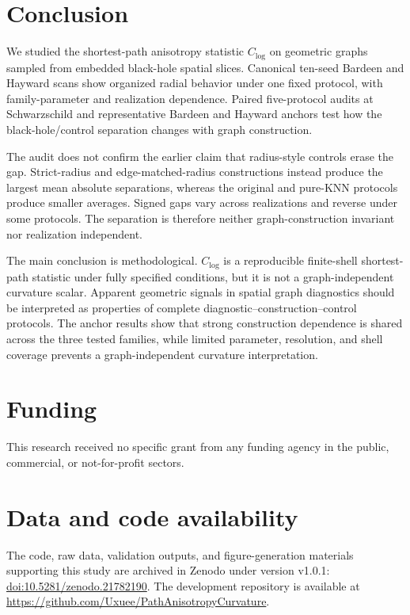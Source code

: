 \documentclass[11pt]{article}
\newcommand{\clog}{C_{\log}}
\begin{document}
\section{Conclusion}

We studied the shortest-path anisotropy statistic $\clog$ on geometric graphs
sampled from embedded black-hole spatial slices. Canonical ten-seed Bardeen and
Hayward scans show organized radial behavior under one fixed protocol, with
family-parameter and realization dependence. Paired five-protocol audits at
Schwarzschild and representative Bardeen and Hayward anchors test how the
black-hole/control separation changes with graph construction.

The audit does not confirm the earlier claim that radius-style controls erase
the gap. Strict-radius and edge-matched-radius constructions instead produce the
largest mean absolute separations, whereas the original and pure-KNN protocols
produce smaller averages. Signed gaps vary across realizations and reverse under
some protocols. The separation is therefore neither graph-construction
invariant nor realization independent.

The main conclusion is methodological. $\clog$ is a reproducible finite-shell
shortest-path statistic under fully specified conditions, but it is not a
graph-independent curvature scalar. Apparent geometric signals in spatial graph
diagnostics should be interpreted as properties of complete
 diagnostic--construction--control protocols. The anchor results show that
strong construction dependence is shared across the three tested families,
while limited parameter, resolution, and shell coverage prevents a
graph-independent curvature interpretation.

\section*{Funding}

This research received no specific grant from any funding agency in the
public, commercial, or not-for-profit sectors.

\section*{Data and code availability}

The code, raw data, validation outputs, and figure-generation materials
supporting this study are archived in Zenodo under version v1.0.1:
\href{https://doi.org/10.5281/zenodo.21782190}{doi:10.5281/zenodo.21782190}.
The development repository is available at
\url{https://github.com/Uxuee/PathAnisotropyCurvature}.
\end{document}
